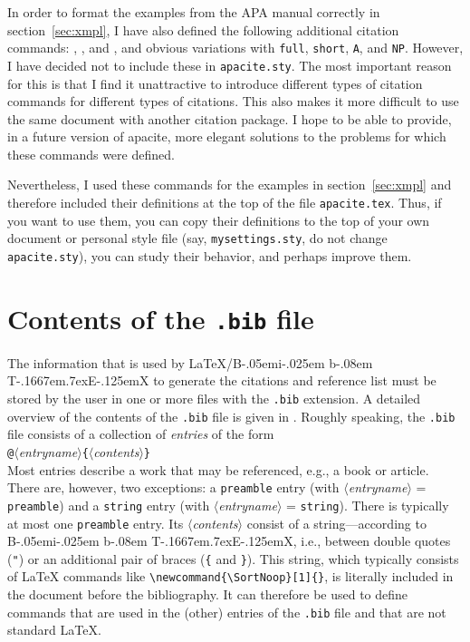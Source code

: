 \documentclass{article}
\makeatletter
\def\@bibleversion{Revised Standard Version}
\def\biblecite#1{%
   {\@ifundefined{flag@bible}%
      {\fullbiblecite{#1}}%
      {\shortbiblecite{#1}}%
   }%
}
\def\fullbiblecite#1{%
   {\BBOP}%
   {#1}%
   {\BBAY{} \@bibleversion}%
   {\BBCP}%
   {\global\expandafter\def\csname flag@bible\endcsname{DUMMY}}%
}
\def\shortbiblecite#1{%
   {\BBOP}%
   {#1}%
   {\BBCP}%
   {\global\expandafter\def\csname flag@bible\endcsname{DUMMY}}%
}
\newcommand{\bibsong}[4]{}
\newcommand{\citesong}[1]{%
  \def\bibsong##1##2##3##4{%
    {\BBOP}\APACciteatitle{##3},{\BAP}{##1}{\BBAY}{##2}{\BBN}{##4}{\BBCP}%
  }%
  \citeauthor{#1}%
  \def\bibsong##1##2##3##4{}%
}
\newcommand{\DSMcite}[1]{%
  {\BBOP}%
  \@for\@citec:=#1\do{%
    \@ifundefined{flag@\@citec\@extra@b@citeb}%
      {\citeNP{\@citec}}%
      {\citeauthor{\@citec}}%
  }%
  {\BBCP}%
}
\def\BibTeX{{\rm B\kern-.05em{\sc i\kern-.025em b}\kern-.08em
    T\kern-.1667em\lower.7ex\hbox{E}\kern-.125emX}}%
\newcommand{\pkg}[1]{\textsf{#1}}%
\newcommand{\fname}[1]{\texttt{#1}}%
\newcommand{\entryname}[1]{\texttt{#1}}%
\newcommand{\cmd}[1]{\texttt{\string#1}}%
\newcommand{\opt}[1]{$\langle${\itshape #1}$\rangle$}%
\makeatother
\begin{document}
In order to format the examples from the APA manual correctly in
section~\ref{sec:xmpl}, I have also defined the following additional citation
commands: \cmd{\DSMcite}, \cmd{\biblecite}, and \cmd{\citesong}, and obvious
variations with \verb+full+, \verb+short+, \verb+A+, and \verb+NP+. However, I
have decided not to include these in \fname{apacite.sty}. The most important
reason for this is that I find it unattractive to introduce different types of
citation commands for different types of citations. This also makes it more
difficult to use the same document with another citation package. I hope to be
able to provide, in a future version of \pkg{apacite}, more elegant solutions
to the problems for which these commands were defined.

Nevertheless, I used these commands for the examples in section~\ref{sec:xmpl}
and therefore included their definitions at the top of the file
\fname{apacite.tex}. Thus, if you want to use them, you can copy their
definitions to the top of your own document or personal style file (say,
\fname{mysettings.sty}, do not change \fname{apacite.sty}), you can study
their behavior, and perhaps improve them.

\section{Contents of the \fname{.bib} file}
\label{sec:bib}
The information that is used by \LaTeX/\BibTeX{} to generate
the citations and reference list must be stored by the user in one
or more files with the \fname{.bib} extension.
A detailed overview of the contents of the \fname{.bib} file is
given in . Roughly speaking, the
\fname{.bib} file consists of a collection of \emph{entries}
of the form
\mbox{}\vspace{0.7\baselineskip}\\
\verb+@+\opt{entryname}\verb+{+\opt{contents}\verb+}+
\mbox{}\vspace{0.7\baselineskip}\\
Most entries describe a work that may be referenced, e.g., a book
or article. There are, however, two exceptions: a \entryname{preamble}
entry (with \opt{entryname} = \verb+preamble+) and a \entryname{string}
entry (with \opt{entryname} = \verb+string+). There is typically
at most one \entryname{preamble} entry. Its \opt{contents} consist of a
string---according to \BibTeX, i.e., between double quotes (\verb+"+)
or an additional pair of braces (\verb+{+ and \verb+}+). This
string, which typically consists of \LaTeX{} commands like
\verb+\newcommand{\SortNoop}[1]{}+, is literally included
in the document before the bibliography. It can therefore be used
to define commands that are used in the (other) entries of the
\fname{.bib} file and that are not standard \LaTeX{}.
\end{document}
